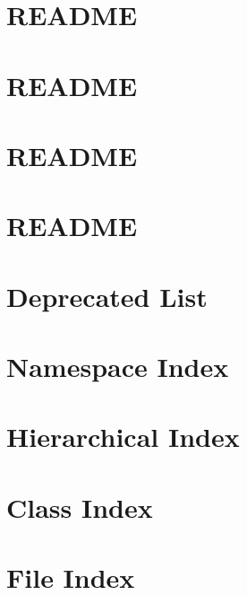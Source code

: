 \documentclass[twoside]{book}
\newcommand{\+}{\discretionary{\mbox{\scriptsize$\hookleftarrow$}}{}{}}
\begin{document}
\chapter{R\+E\+A\+D\+ME}
\label{md_smacc_sm_reference_library_sm_starcraft_ai_README}

\chapter{R\+E\+A\+D\+ME}
\label{md_smacc_sm_reference_library_sm_three_some_README}

\chapter{R\+E\+A\+D\+ME}
\label{md_smacc_sm_reference_library_sm_update_loop_README}

\chapter{R\+E\+A\+D\+ME}
\label{md_smacc_sm_reference_library_sm_viewer_sim_README}

\chapter{Deprecated List}
\label{deprecated}

\chapter{Namespace Index}

\chapter{Hierarchical Index}

\chapter{Class Index}

\chapter{File Index}

\end{document}
